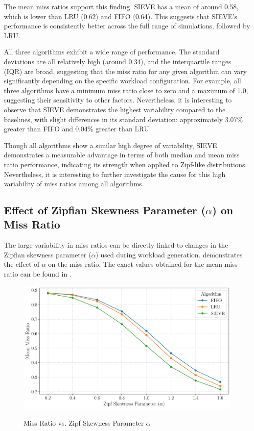The mean miss ratios support this finding. SIEVE has a mean of around 0.58, which is lower than LRU (0.62) and FIFO (0.64). This suggests that SIEVE's performance is consistently better across the full range of simulations, followed by LRU.

All three algorithms exhibit a wide range of performance. The standard deviations are all relatively high (around 0.34), and the interquartile ranges (IQR) are broad, suggesting that the miss ratio for any given algorithm can vary significantly depending on the specific workload configuration. For example, all three algorithms have a minimum miss ratio close to zero and a maximum of 1.0, suggesting their sensitivity to other factors. Nevertheless, it is interesting to observe that SIEVE demonstrates the highest variability compared to the baselines, with slight differences in its standard deviation: approximately 3.07\% greater than FIFO and 0.04\% greater than LRU.

Though all algorithms show a similar high degree of variability, SIEVE demonstrates a measurable advantage in terms of both median and mean miss ratio performance, indicating its strength when applied to Zipf-like distributions. Nevertheless, it is interesting to further investigate the cause for this high variability of miss ratios among all algorithms.

\subsection{Effect of Zipfian Skewness Parameter ($\alpha$) on Miss Ratio}\label{results:alpha-miss-ratio}


The large variability in miss ratios can be directly linked to changes in the Zipfian skewness parameter ($\alpha$) used during workload generation.  demonstrates the effect of $\alpha$ on the miss ratio. The exact values obtained for the mean miss ratio can be found in .

\begin{figure}[h!]
    \centering
    \caption{Miss Ratio vs. Zipf Skewness Parameter $\alpha$}
    \includegraphics[width=0.8\linewidth]{figures/simulations/miss_ratio_vs_alpha_no_title.pdf}
    \label{fig:miss-ratio-vs-alpha}
\end{figure}

